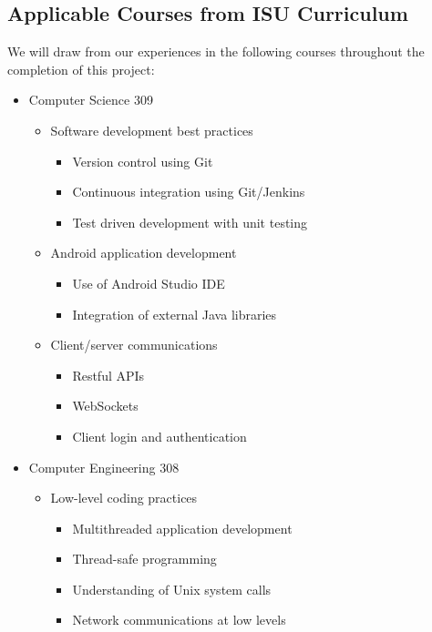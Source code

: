 \documentclass[11pt]{article}
\begin{document}
\subsection*{Applicable Courses from ISU Curriculum}
We will draw from our experiences in the following courses throughout the completion of this project:\\
\begin{itemize}
	\item{Computer Science 309}
	\begin{itemize}
		\item{Software development best practices}
		\begin{itemize}
			\item{Version control using Git}
			\item{Continuous integration using Git/Jenkins}
			\item{Test driven development with unit testing}
		\end{itemize}
		\item{Android application development}
		\begin{itemize}
			\item{Use of Android Studio IDE}
			\item{Integration of external Java libraries}
		\end{itemize}
		\item{Client/server communications}
		\begin{itemize}
			\item{Restful APIs}
			\item{WebSockets}
			\item{Client login and authentication}
		\end{itemize}
	\end{itemize}
	
	\item{Computer Engineering 308}
	\begin{itemize}
		\item{Low-level coding practices}
		\begin{itemize}
			\item{Multithreaded application development}
			\item{Thread-safe programming}
			\item{Understanding of Unix system calls}
			\item{Network communications at low levels}
		\end{itemize}
	\end{itemize}
	

\end{itemize}
\end{document}
